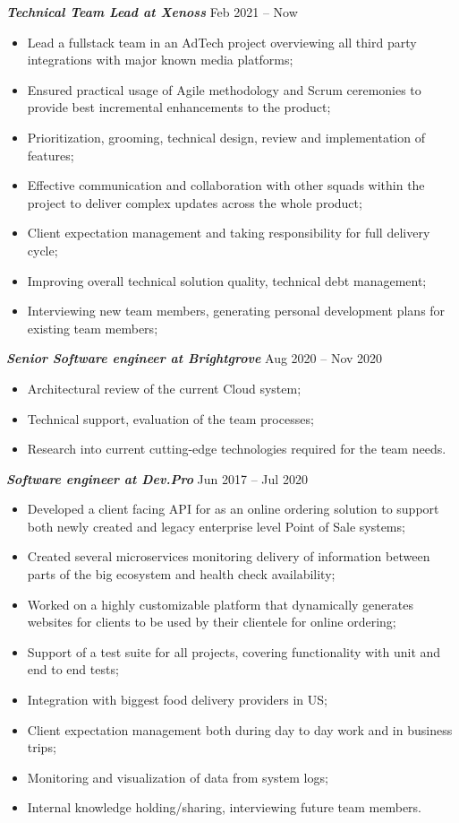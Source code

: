 \documentclass[margin, 10pt]{res} %
\begin{document}
\begin{resume}
{\sl \bf Technical Team Lead at Xenoss } \hfill Feb 2021 -- Now
\begin{itemize}
 \item Lead a fullstack team in an AdTech project overviewing all third party integrations with major known media platforms;
 \item Ensured practical usage of Agile methodology and Scrum ceremonies to provide best incremental enhancements to the product;
 \item Prioritization, grooming, technical design, review and implementation of features;
 \item Effective communication and collaboration with other squads within the project to deliver complex updates across the whole product;
 \item Client expectation management and taking responsibility for full delivery cycle;
 \item Improving overall technical solution quality, technical debt management;
 \item Interviewing new team members, generating personal development plans for existing team members;
\end{itemize}

{\sl \bf Senior Software engineer at Brightgrove } \hfill Aug 2020 -- Nov 2020
\begin{itemize}
 \item Architectural review of the current Cloud system;
 \item Technical support, evaluation of the team processes;
 \item Research into current cutting-edge technologies required for the team needs.
\end{itemize}

{\sl \bf  Software engineer at Dev.Pro } \hfill Jun 2017 -- Jul 2020
 \begin{itemize}
 \item Developed a client facing API for as an online ordering solution to support both newly created and legacy enterprise level Point of Sale systems;
 \item Created several microservices monitoring delivery of information between parts of the big ecosystem and health check availability;
 \item Worked on a highly customizable platform that dynamically generates websites for clients to be used by their clientele for online ordering;
 \item Support of a test suite for all projects, covering functionality with unit and end to end tests;
 \item Integration with biggest food delivery providers in US;
 \item Client expectation management both during day to day work and in business trips;
 \item Monitoring and visualization of data from system logs;
 \item Internal knowledge holding/sharing, interviewing future team members.
\end{itemize}


\end{resume}
\end{document}
